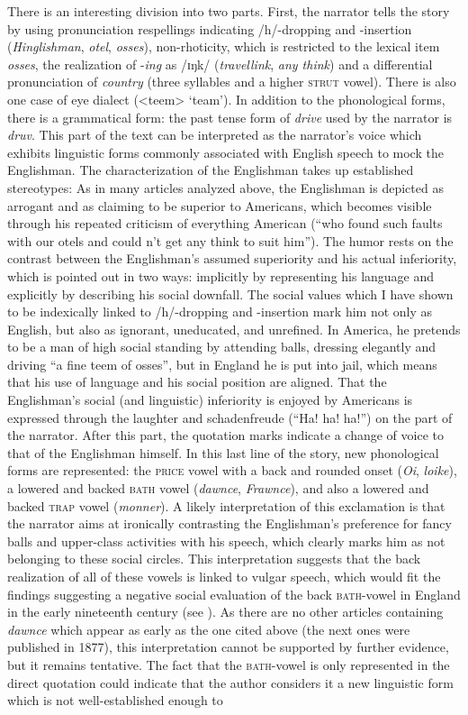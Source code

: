 There is an interesting division into two parts. First, the narrator tells the story by using pronunciation respellings indicating /h/-dropping and -insertion (\emph{Hinglishman}, \emph{otel}, \emph{osses}), non-rhoticity, which is restricted to the lexical item \emph{osses}, the realization of -\emph{ing} as /ɪŋk/ (\emph{travellink}, \emph{any think}) and a differential pronunciation of \emph{country} (three syllables and a higher \textsc{strut} vowel). There is also one case of eye dialect (<teem> ‘team’). In addition to the phonological forms, there is a grammatical form: the past tense form of \emph{drive} used by the narrator is \emph{druv}. This part of the text can be interpreted as the narrator’s voice which exhibits linguistic forms commonly associated with English speech to mock the Englishman. The characterization of the Englishman takes up established stereotypes: As in many articles analyzed above, the Englishman is depicted as arrogant and as claiming to be superior to Americans, which becomes visible through his repeated criticism of everything American (“who found such faults with our otels and could n’t get any think to suit him”). The humor rests on the contrast between the Englishman’s assumed superiority and his actual inferiority, which is pointed out in two ways: implicitly by representing his language and explicitly by describing his social downfall. The social values which I have shown to be indexically linked to /h/-dropping and -insertion mark him not only as English, but also as ignorant, uneducated, and unrefined. In America, he pretends to be a man of high social standing by attending balls, dressing elegantly and driving “a fine teem of osses”, but in England he is put into jail, which means that his use of language and his social position are aligned. That the Englishman’s social (and linguistic) inferiority is enjoyed by Americans is expressed through the laughter and schadenfreude (“Ha! ha! ha!”) on the part of the narrator. After this part, the quotation marks indicate a change of voice to that of the Englishman himself. In this last line of the story, new phonological forms are represented: the \textsc{price} vowel with a back and rounded onset (\emph{Oi}, \emph{loike}), a lowered and backed \textsc{bath} vowel (\emph{dawnce}, \emph{Frawnce}), and also a lowered and backed \textsc{trap} vowel (\emph{monner}). A likely interpretation of this exclamation is that the narrator aims at ironically contrasting the Englishman’s preference for fancy balls and upper-class activities with his speech, which clearly marks him as not belonging to these social circles. This interpretation suggests that the back realization of all of these vowels is linked to vulgar speech, which would fit the findings suggesting a negative social evaluation of the back \textsc{bath}-vowel in England in the early nineteenth century (see ). As there are no other articles containing \emph{dawnce} which appear as early as the one cited above (the next ones were published in 1877), this interpretation cannot be supported by further evidence, but it remains tentative. The fact that the \textsc{bath}{}-vowel is only represented in the direct quotation could indicate that the author considers it a new linguistic form which is not well-established enough to 